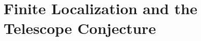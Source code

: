 \section{Finite Localization and the Telescope Conjecture}\label{sec:chromatic-results-telescopeconjecture}
